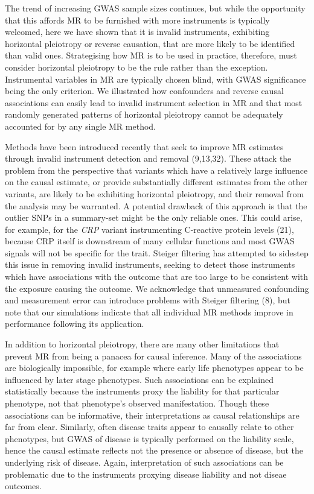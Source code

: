 \documentclass[]{article}
\begin{document}
The trend of increasing GWAS sample sizes continues, but while the
opportunity that this affords MR to be furnished with more instruments
is typically welcomed, here we have shown that it is invalid
instruments, exhibiting horizontal pleiotropy or reverse causation, that
are more likely to be identified than valid ones. Strategising how MR is
to be used in practice, therefore, must consider horizontal pleiotropy
to be the rule rather than the exception. Instrumental variables in MR
are typically chosen blind, with GWAS significance being the only
criterion. We illustrated how confounders and reverse causal
associations can easily lead to invalid instrument selection in MR and
that most randomly generated patterns of horizontal pleiotropy cannot be
adequately accounted for by any single MR method.

Methods have been introduced recently that seek to improve MR estimates
through invalid instrument detection and removal (9,13,32). These attack
the problem from the perspective that variants which have a relatively
large influence on the causal estimate, or provide substantially
different estimates from the other variants, are likely to be exhibiting
horizontal pleiotropy, and their removal from the analysis may be
warranted. A potential drawback of this approach is that the outlier
SNPs in a summary-set might be the only reliable ones. This could arise,
for example, for the \emph{CRP} variant instrumenting C-reactive protein
levels (21), because CRP itself is downstream of many cellular functions
and most GWAS signals will not be specific for the trait. Steiger
filtering has attempted to sidestep this issue in removing invalid
instruments, seeking to detect those instruments which have associations
with the outcome that are too large to be consistent with the exposure
causing the outcome. We acknowledge that unmeasured confounding and
measurement error can introduce problems with Steiger filtering (8), but
note that our simulations indicate that all individual MR methods
improve in performance following its application.

In addition to horizontal pleiotropy, there are many other limitations
that prevent MR from being a panacea for causal inference. Many of the
associations are biologically impossible, for example where early life
phenotypes appear to be influenced by later stage phenotypes. Such
associations can be explained statistically because the instruments
proxy the liability for that particular phenotype, not that phenotype's
observed manifestation. Though these associations can be informative,
their interpretations as causal relationships are far from clear.
Similarly, often disease traits appear to causally relate to other
phenotypes, but GWAS of disease is typically performed on the liability
scale, hence the causal estimate reflects not the presence or absence of
disease, but the underlying risk of disease. Again, interpretation of
such associations can be problematic due to the instruments proxying
disease liability and not diseae outcomes.
\end{document}

